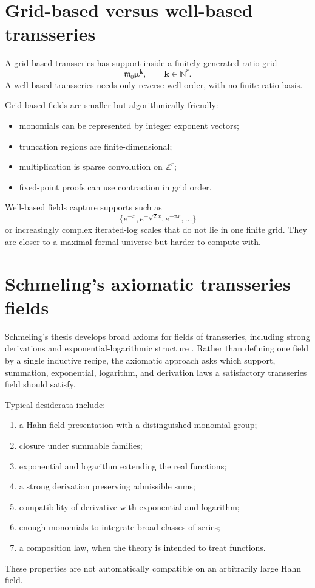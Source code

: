 \documentclass[11pt,openany]{book}
\theoremstyle{definition}
\theoremstyle{plain}
\theoremstyle{remark}
\newcommand{\N}{\mathbb{N}}
\newcommand{\Z}{\mathbb{Z}}
\newcommand{\m}{\mathfrak{m}}
\begin{document}
\section{Grid-based versus well-based transseries}

A grid-based transseries has support inside a finitely generated ratio grid
\[
 \m_0\boldsymbol\mu^{\mathbf k},
 \qquad \mathbf k\in\N^r.
\]
A well-based transseries needs only reverse well-order, with no finite ratio basis.

Grid-based fields are smaller but algorithmically friendly:
\begin{itemize}
 \item monomials can be represented by integer exponent vectors;
 \item truncation regions are finite-dimensional;
 \item multiplication is sparse convolution on $\Z^r$;
 \item fixed-point proofs can use contraction in grid order.
\end{itemize}

Well-based fields capture supports such as
\[
 \{e^{-x},e^{-\sqrt2x},e^{-\pi x},\dots\}
\]
or increasingly complex iterated-log scales that do not lie in one finite grid. They are closer to a maximal formal universe but harder to compute with.

\section{Schmeling's axiomatic transseries fields}

Schmeling's thesis develops broad axioms for fields of transseries, including strong derivations and exponential-logarithmic structure \cite{schmeling}. Rather than defining one field by a single inductive recipe, the axiomatic approach asks which support, summation, exponential, logarithm, and derivation laws a satisfactory transseries field should satisfy.

Typical desiderata include:
\begin{enumerate}
 \item a Hahn-field presentation with a distinguished monomial group;
 \item closure under summable families;
 \item exponential and logarithm extending the real functions;
 \item a strong derivation preserving admissible sums;
 \item compatibility of derivative with exponential and logarithm;
 \item enough monomials to integrate broad classes of series;
 \item a composition law, when the theory is intended to treat functions.
\end{enumerate}
These properties are not automatically compatible on an arbitrarily large Hahn field.
\end{document}
